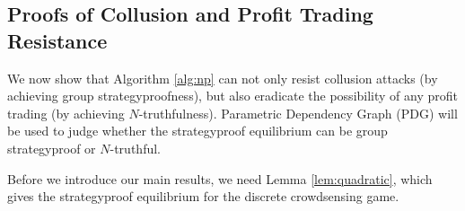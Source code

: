 \documentclass[conference]{IEEEtran}
\theoremstyle{definition}
\begin{document}
{\color{black}
\subsection{Proofs of Collusion and Profit Trading Resistance}
We now show that Algorithm \ref{alg:np} can not only resist collusion attacks (by achieving group strategyproofness), but also eradicate the possibility of any profit trading (by achieving $N$-truthfulness). Parametric Dependency Graph (PDG) will be used to judge whether the strategyproof equilibrium can be group strategyproof or $N$-truthful.

{\color{blue} Before we introduce our main results, we need Lemma \ref{lem:quadratic}, which gives the strategyproof equilibrium for the discrete crowdsensing game. }
\begin{figure}[!t]
\centering{}
\setlength{\unitlength}{1cm}
%
\end{figure}}
\end{document}
